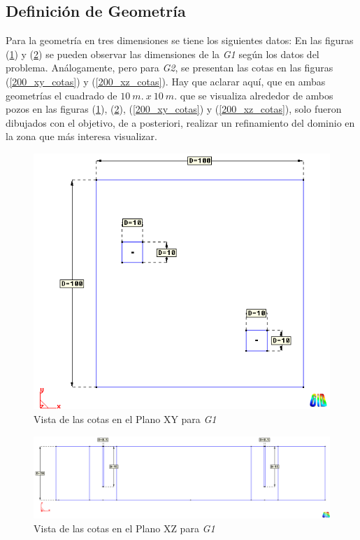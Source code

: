 \documentclass[10pt,a4paper,final]{article}
\begin{document}
\subsection{Definición de Geometría}
Para la geometría en tres dimensiones se tiene los siguientes datos:
En las figuras (\ref{100_xy_cotas}) y (\ref{100_xz_cotas}) se pueden observar
las dimensiones de la \emph{G1} según los datos del problema. Análogamente, pero para \emph{G2}, se presentan las cotas en las figuras (\ref{200_xy_cotas}) y (\ref{200_xz_cotas}).
Hay que aclarar aquí, que en ambas geometrías el cuadrado de $10~m.~x~10~m.$ que se visualiza
alrededor de ambos pozos en las figuras (\ref{100_xy_cotas}), (\ref{100_xz_cotas}), (\ref{200_xy_cotas}) y (\ref{200_xz_cotas}), solo fueron dibujados con el
objetivo, de a posteriori, realizar un refinamiento del dominio en la zona que más interesa visualizar.\\
%
\begin{figure}[tbhp]
\centerline{\includegraphics[scale=0.4]{img/100m/100_xy_cotas}}
\caption{Vista de las cotas en el Plano XY para \emph{G1}}
\label{100_xy_cotas}
\end{figure}
%
\begin{figure}[tbhp]
\centerline{\includegraphics[scale=0.4]{img/100m/100_xz_cotas}}
\caption{Vista de las cotas en el Plano XZ para \emph{G1}}
\label{100_xz_cotas}
\end{figure}
\end{document}
